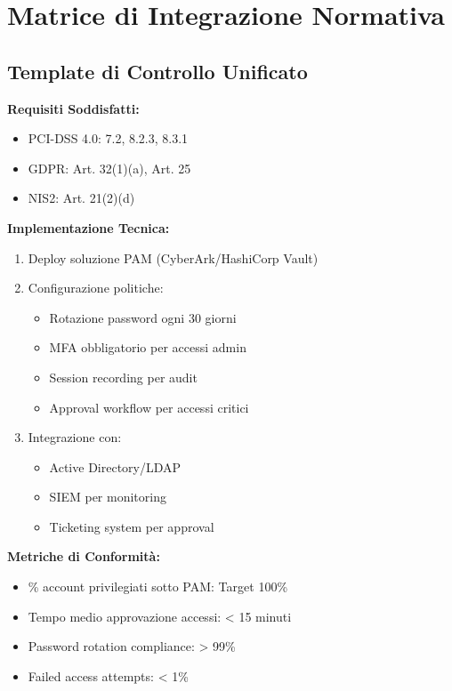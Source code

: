 \section{\texorpdfstring{Matrice di Integrazione Normativa}{D.2 - Matrice di Integrazione Normativa}}

\subsection{\texorpdfstring{Template di Controllo Unificato}{D.2.1 - Template di Controllo Unificato}}

\begin{tcolorbox}[
    colback=blue!5!white,
    colframe=blue!75!black,
    title={\textbf{Controllo Unificato CU-001: Gestione Accessi Privilegiati}},
    fonttitle=\bfseries,
    boxrule=1.5pt,
    arc=2mm,
    breakable
]
\textbf{Requisiti Soddisfatti:}
\begin{itemize}
    \item PCI-DSS 4.0: 7.2, 8.2.3, 8.3.1
    \item GDPR: Art. 32(1)(a), Art. 25
    \item NIS2: Art. 21(2)(d)
\end{itemize}

\textbf{Implementazione Tecnica:}
\begin{enumerate}
    \item Deploy soluzione PAM (CyberArk/HashiCorp Vault)
    \item Configurazione politiche:
    \begin{itemize}
        \item Rotazione password ogni 30 giorni
        \item MFA obbligatorio per accessi admin
        \item Session recording per audit
        \item Approval workflow per accessi critici
    \end{itemize}
    \item Integrazione con:
    \begin{itemize}
        \item Active Directory/LDAP
        \item SIEM per monitoring
        \item Ticketing system per approval
    \end{itemize}
\end{enumerate}

\textbf{Metriche di Conformità:}
\begin{itemize}
    \item \% account privilegiati sotto PAM: Target 100\%
    \item Tempo medio approvazione accessi: < 15 minuti
    \item Password rotation compliance: > 99\%
    \item Failed access attempts: < 1\%
\end{itemize}


\end{tcolorbox}
